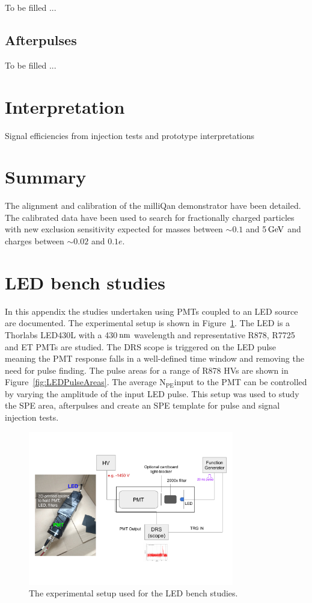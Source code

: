 \documentclass[12pt]{article}
\newcommand{\unit}[1]{\ensuremath{\text{\,#1}}\xspace}
\newcommand{\npe} {\mbox{\ensuremath{\textrm{N}_\textrm{PE}}\xspace}}
\begin{document}
To be filled ...

\subsection{Afterpulses}

To be filled ...

\section{Interpretation}

Signal efficiencies from injection tests and prototype interpretations
\section{Summary}

The alignment and calibration of the milliQan demonstrator have been detailed. The calibrated
data have been used to search for fractionally charged particles with new 
exclusion sensitivity expected for masses between $\sim0.1$ and 5\unit{GeV} 
and charges between $\sim0.02$ and $0.1e$.

\appendix
\section{LED bench studies}
\label{app:speLEDCalib}
In this appendix the studies undertaken using PMTs coupled to an LED source are documented.
The experimental setup is shown in Figure~\ref{fig:LEDSetup}. The LED is a Thorlabs LED430L with a 430\unit{nm} wavelength 
and representative R878, R7725 and ET PMTs are studied. The DRS scope is triggered on
the LED pulse meaning the PMT response falls in a well-defined time window 
and removing the need for pulse finding. The pulse areas for a range of R878 HVs are
shown in Figure~\ref{fig:LEDPulseAreas}. The average \npe input to the PMT can be controlled by varying the amplitude of the input LED pulse.
This setup was used to study the SPE area, afterpulses and create an SPE template for 
pulse and signal injection tests. 

\begin{figure}[ht!]
    \centering
    \includegraphics[width=0.8\textwidth]{figures/LEDsetup}
    \caption{\label{fig:LEDSetup} The experimental setup used for the LED bench studies. }
\end{figure}
\end{document}
